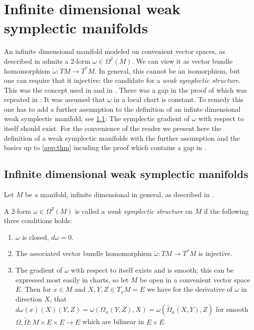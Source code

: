 \documentclass[12pt]{amsart}
\newcommand{\AuthorCOMMENT}[3]{\textcolor{#2}{{[\textbf{#1:} \textsl{#3}}]}}  %
\newcommand{\Sadashige}[1]{\AuthorCOMMENT{Sadashige}{violet}{#1}}
\newcommand{\rev}[1]{#1}
\theoremstyle{definition}
\def\om{\omega}
\def\Om{\Omega}
\def\x{\times}
\begin{document}
{%


}


\section{Infinite dimensional weak symplectic manifolds}\label{app:weak_symplectic}
An infinite dimensional manifold modeled on convenient vector spaces, as described in \cite[Chapter VI]{kriegl_michor_1997convenient} admits a 2-form $\om\in \Om^2(M)$. We can view it as vector bundle homomorphism $\check\om:TM\to T^*M$. In general, this cannot be an isomorphism, but one can require that it injective:  the candidate for a \emph{weak symplectic structure}. This was the concept used in \cite[Section 48]{kriegl_michor_1997convenient} and in  \cite[Section 2]{Michor06a}. There was a gap in the proof of  \cite[Theorem 48.8]{kriegl_michor_1997convenient} which was repeated in \cite{Michor06a}: It was assumed that $\om$ in a local chart is constant. To remedy this  one has to add a further assumption to the definition of an infinte dimensional weak symplectic manifold; see \ref{app:def}: The symplectic gradient of $\om$ with respect to itself should exist. For the convenience of the reader we present here the definition of a  weak symplectic manifolds with the further assumption and the basics up to \ref{app:thm} incuding  the proof which contains a gap in \cite[Theorem 48.8]{kriegl_michor_1997convenient}.

\subsection{Infinite dimensional weak symplectic manifolds}\label{app:def}
Let $M$ be a manifold,   
infinite dimensional in general, as described in \cite[Chapter VI]{kriegl_michor_1997convenient}.
                 
A $2$-form  $\om\in\Om^2(M)$ is called a 
{\it weak symplectic structure} 
on $M$ if the following three conditions holds:
\begin{enumerate}
\item $\om$ is closed, $d\om=0$. 
\item The associated vector bundle homomorphism
       $ \check\om: TM \to T^*M$ is injective. 
\item The gradient of $\om$ with respect to itself exists and is smooth;
this can be expressed most easily in charts, 
so let $M$ be open in a convenient vector space $E$. Then for $x\in M$ and 
$X,Y,Z\in T_xM=E$ we have \rev{for the derivative of $\omega$ in direction $X$, that}
$d\om(x)(X)(Y,Z)= \om(\Om_x(Y,Z),X) = \om(\tilde\Om_x(X,Y),Z)$
for smooth $\Om,\tilde\Om: M\x E\x E \to E$ which are bilinear in $E\x E$.  
\end{enumerate}
\end{document}
